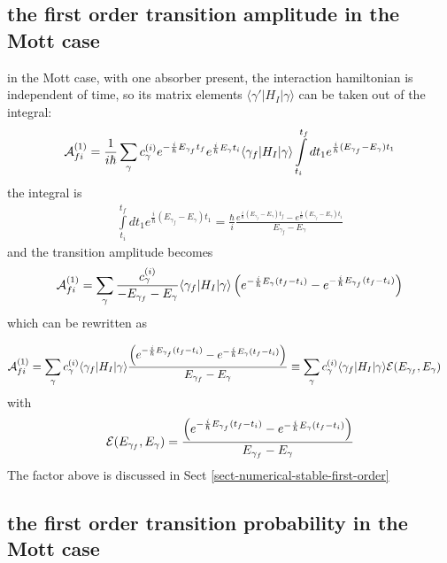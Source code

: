 \subsection{the first order transition amplitude in the Mott case }
in the Mott case, with one absorber present, the interaction hamiltonian is independent of time, so its matrix elements \(\langle \gamma' |H_I| \gamma\rangle\) can be taken out of the integral:
\begin{align}
  {\cal A}_{fi}^{(1)} = \frac{1}{i\hbar} \sum\limits_{\gamma} c_{\gamma}^{(i)}e^{-\frac{i}{\hbar}E_{\gamma_f} t_f}e^{\frac{i}{\hbar}E_{\gamma} t_i} \langle \gamma_f|H_I|\gamma\rangle\int\limits_{t_i}^{t_f}dt_1e^{\frac{i}{\hbar}(E_{\gamma_f}-E_{\gamma} )t_1}
\end{align}
the integral is
\begin{align}
  \int\limits_{t_i}^{t_f}dt_1e^{\frac{i}{\hbar}(E_{\gamma_f}-E_{\gamma} )t_1}= \frac{\hbar}i\frac{e^{\frac{i}\hbar (E_{\gamma_f} -E_{\gamma})t_f}-e^{\frac{i}\hbar (E_{\gamma_f} -E_{\gamma})t_i}}{E_{\gamma_f}-  E_{\gamma}}
\end{align}
and the transition amplitude becomes
\begin{align}
  {\cal A}_{fi}^{(1)} = \sum_\gamma \frac{c_\gamma^{(i)}}{-E_{\gamma_f}- E_{\gamma}} \langle \gamma_f|H_I|\gamma\rangle  \left(e^{-\frac{i}{\hbar}E_{\gamma}(t_f-t_i)}-e^{-\frac{i}{\hbar}E_{\gamma_f}(t_f-t_i)}\right)
\end{align}
which can be rewritten as
\begin{importantbox}
  \begin{align}
    {\cal A}_{fi}^{(1)} & =\sum_\gamma {c_\gamma^{(i)}}\langle \gamma_f|H_I|\gamma\rangle  \frac{\left(e^{-\frac{i}{\hbar}E_{\gamma_f}(t_f-t_i)}-e^{-\frac{i}{\hbar}{ E_\gamma}(t_f-t_i)} \right)}{{E_{\gamma_f}- E_\gamma}} \equiv \sum_\gamma {c_\gamma^{(i)}}\langle \gamma_f|H_I|\gamma\rangle   {\cal E}(E_{\gamma_f},E_{\gamma})\label{first_order_transition_amplitude}
  \end{align}
  with
  \begin{align}
    {\cal E}(E_{\gamma_f},E_\gamma) = \frac{\left(e^{-\frac{i}{\hbar}E_{\gamma_f}(t_f-t_i)}-e^{-\frac{i}{\hbar}{ E_\gamma}(t_f-t_i)} \right)}{{E_{\gamma_f}- E_\gamma}}
  \end{align}
  The factor above is discussed in Sect \ref{sect-numerical-stable-first-order}
\end{importantbox}

\subsection{the first order transition probability in the Mott case }

